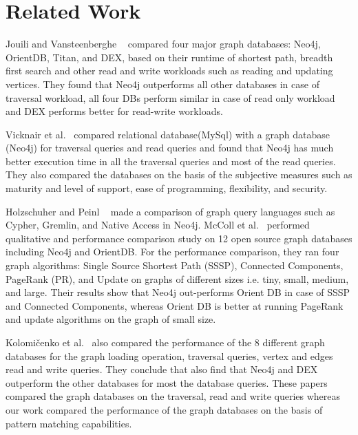 
\section{Related Work}

Jouili and Vansteenberghe ~\cite{jouili2013empirical} compared four major graph databases: Neo4j, OrientDB, Titan, and DEX, based on their runtime of shortest path, breadth first search and other read and write workloads such as reading and updating vertices. They found that Neo4j outperforms all other databases in case of traversal workload, all four DBs perform similar in case of read only workload and DEX performs better for read-write workloads.

Vicknair et al.~\cite{vicknair2010comparison} compared relational database(MySql) with a graph database (Neo4j) for traversal queries and read queries and found that Neo4j has much better execution time in all the traversal queries and most of the read queries. They also compared the databases on the basis of the subjective measures such as maturity and level of support, ease of programming, flexibility, and security.

Holzschuher and Peinl ~\cite{holzschuher2013performance} made a comparison of graph query languages such as Cypher, Gremlin, and Native Access in Neo4j.  
McColl et al.~\cite{mccoll2014performance} performed qualitative and performance comparison study on 12 open source graph databases including Neo4j and OrientDB. For the performance comparison, they ran four graph algorithms: Single Source Shortest Path (SSSP), Connected Components, PageRank (PR), and Update on graphs of different sizes i.e. tiny, small, medium, and large. Their results show that Neo4j out-performs Orient DB in case of SSSP and Connected Components, whereas Orient DB is better at running PageRank and update algorithms on the graph of small size.

Kolomičenko et al.~\cite{kolomivcenko2013experimental} also compared the performance of the 8 different graph databases for the graph loading operation, traversal queries, vertex and edges read and write queries. They conclude that also find that Neo4j and DEX outperform the other databases for most the database queries. These papers compared the graph databases on the traversal, read and write queries whereas our work compared the performance of the graph databases on the basis of pattern matching capabilities.

